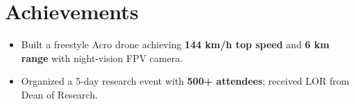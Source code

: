 \documentclass[letterpaper,10pt]{article}
\newcommand{\resumeItem}[1]{\item\small{{#1 \vspace{-3pt}}}}
\newcommand{\resumeItemListStart}{\begin{itemize}[leftmargin=*]}
\newcommand{\resumeItemListEnd}{\end{itemize}\vspace{-4pt}}
\begin{document}
\section{Achievements}
\resumeItemListStart
  \resumeItem{Built a freestyle Acro drone achieving \textbf{144 km/h top speed} and \textbf{6 km range} with night-vision FPV camera.}
  \resumeItem{Organized a 5-day research event with \textbf{500+ attendees}; received LOR from Dean of Research.}
\resumeItemListEnd
\end{document}
